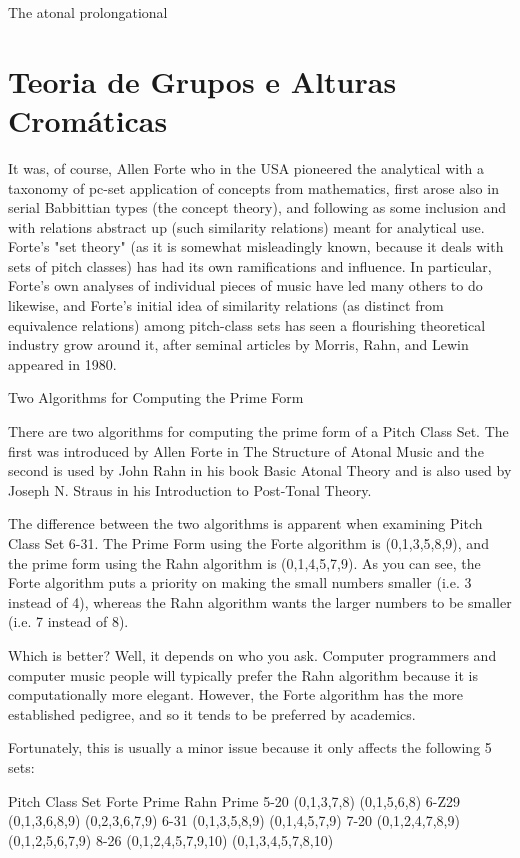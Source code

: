\documentclass[
	12pt,				%
	openright,			%
	twoside,			%
	a4paper,			%
	english,			%
	french,				%
	spanish,			%
	brazil				%
	]{abntex2}
\begin{document}
The atonal prolongational 



\chapter{Teoria de Grupos e Alturas Cromáticas}
\label{modelos}


\cite{straus2004}

It was, of course, Allen Forte who in the USA pioneered the analytical with a taxonomy of pc-set application of concepts from mathematics, first arose also in serial Babbittian types (the concept theory), and following as
some inclusion and with relations abstract up (such similarity relations) meant for analytical use. Forte's "set theory" (as it is somewhat misleadingly known, because it deals with sets of pitch classes) has had its own
ramifications and influence. In particular, Forte's own analyses of individual pieces of music have led many others to do likewise, and Forte's initial idea of similarity relations (as distinct from equivalence relations) among pitch-class sets has seen a flourishing theoretical industry grow around it, after seminal articles by Morris, Rahn, and Lewin appeared in 1980.\cite{rahn2004swerve}

\begin{citacao}
Two Algorithms for Computing the Prime Form

There are two algorithms for computing the prime form of a Pitch Class Set. The first was introduced by Allen Forte in The Structure of Atonal Music and the second is used by John Rahn in his book Basic Atonal Theory and is also used by Joseph N. Straus in his Introduction to Post-Tonal Theory.

The difference between the two algorithms is apparent when examining Pitch Class Set 6-31. The Prime Form using the Forte algorithm is (0,1,3,5,8,9), and the prime form using the Rahn algorithm is (0,1,4,5,7,9). As you can see, the Forte algorithm puts a priority on making the small numbers smaller (i.e. 3 instead of 4), whereas the Rahn algorithm wants the larger numbers to be smaller (i.e. 7 instead of 8).

Which is better? Well, it depends on who you ask. Computer programmers and computer music people will typically prefer the Rahn algorithm because it is computationally more elegant. However, the Forte algorithm has the more established pedigree, and so it tends to be preferred by academics.

Fortunately, this is usually a minor issue because it only affects the following 5 sets:

Pitch Class Set	Forte Prime	Rahn Prime
5-20	(0,1,3,7,8)	(0,1,5,6,8)
6-Z29	(0,1,3,6,8,9)	(0,2,3,6,7,9)
6-31	(0,1,3,5,8,9)	(0,1,4,5,7,9)
7-20	(0,1,2,4,7,8,9)	(0,1,2,5,6,7,9)
8-26	(0,1,2,4,5,7,9,10)	(0,1,3,4,5,7,8,10)
\end{citacao}
\end{document}
